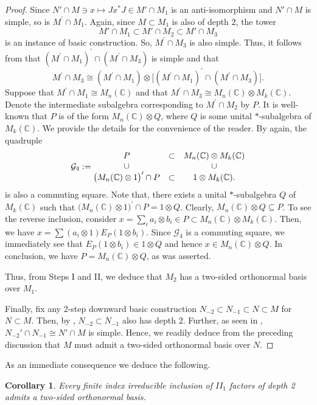 \documentclass{amsart}
\newtheorem{corollary}[theorem]{Corollary}
\theoremstyle{definition}
\theoremstyle{theorem}
\newcommand{\C}{\mathbb{C}}
\newcommand{\ot}{\otimes}
\begin{document}
\begin{proof}
 Since $N'\cap M \ni x \mapsto Jx^*J \in M'\cap M_1$ is an
 anti-isomorphism and $N'\cap M$ is simple, so is $M^{\prime}\cap
 M_1$. Again, since $M \subset M_1$ is also of depth $2$, the tower
 \[
M'\cap M_1 \subset M'\cap M_2 \subset M'\cap M_3
 \]
is an instance of basic construction. So, $M^{\prime}\cap M_3$ is also simple.
Thus, it follows from \cite[Lemma 2.2.2]{GHJ} that $(M^{\prime}\cap
M_1)^{\prime}\cap (M^{\prime}\cap M_3)$ is simple and that
\[
M^{\prime}\cap M_3 \cong (M^{\prime}\cap
M_1)\otimes \big[(M^{\prime}\cap M_1)^{\prime}\cap (M^{\prime}\cap
  M_3)\big].
\]
 Suppose that
$M^{\prime}\cap M_1\cong M_n(\C)$ and that $M^{\prime}\cap M_3\cong M_n(\C)\otimes
 M_k(\C).$ Denote the intermediate subalgebra corresponding to $M^{\prime}\cap M_2$ by
 $P$. It is well-known that $P$ is of the form $M_n(\C)\otimes Q$, where $Q$ is some unital $*$-subalgebra of $M_k(\C)$. We provide the details for the convenience of the reader. By \cite[Proposition 4.2.7]{GHJ} again, the quadruple
 \[
 \mathcal{G}_4:=\begin{matrix} P &\subset & M_n(\C)\otimes M_k(\C) \cr
 \cup &\ &\cup\cr {\big(M_n(\C) \ot 1\big)}^{\prime}\cap P &\subset &
 1\otimes M_k(\C).
 \end{matrix}
 \]
is also a commuting square. Note that, there exists a unital
$*$-subalgebra $Q$ of $M_k(\C)$ such that ${\big(M_n(\C) \ot
  1\big)}^{\prime}\cap P=1\otimes Q$. Clearly,  $M_n(\C)\otimes Q
\subseteq P$. To see the reverse inclusion, consider $x = \sum_i
a_i\otimes b_i \in P \subset M_n(\C)\otimes M_k(\C).$ Then, we have $x= \sum
(a_i\otimes 1) E_P(1\otimes b_i)$. Since $\mathcal{G}_4$ is a
commuting square, we immediately see that $E_P(1\otimes b_i)\in
1\otimes Q$ and hence $x\in M_n(\C)\otimes Q.$ In conclusion, we have
$P=M_n(\C)\otimes Q$, as was asserted. 

Thus, from Steps I and II, we deduce that  $M_2$  has a two-sided orthonormal basis over $M_1$.\medskip

Finally, fix any 2-step downward basic construction $N_{-2}\subset
N_{-1}\subset N\subset M$ for $N\subset M$. Then, by , $N_{-2}\subset N_{-1}$ also has depth $2$. Further, as seen
in , $N_{-2}'\cap N_{-1} \cong N'\cap M$ is
simple. Hence, we readily deduce from the preceding discussion that
$M$ must admit a two-sided orthonormal basis over $N$.
  \end{proof}
As an immediate consequence we deduce the following.
\begin{corollary}
 Every finite index irreducible inclusion of $II_1$ factors of depth 2 admits a two-sided orthonormal basis.
\end{corollary}
\end{document}
